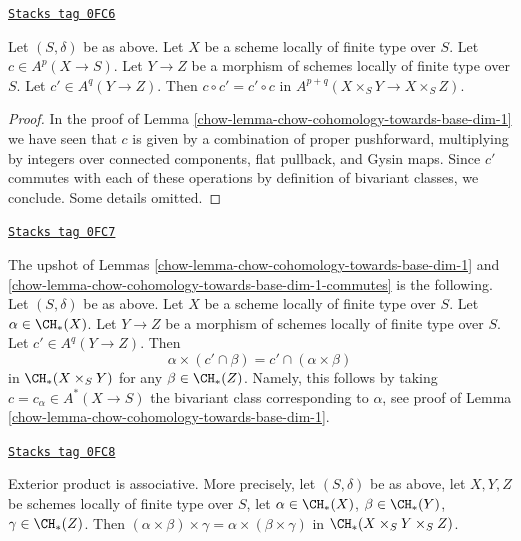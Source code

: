 \begin{lemma}
\label{chow-lemma-chow-cohomology-towards-base-dim-1-commutes}
\href{https://stacks.math.columbia.edu/tag/0FC6}{\texttt{Stacks tag 0FC6}}

Let $(S, \delta)$ be as above. Let $X$ be a scheme locally of finite type
over $S$. Let $c \in A^p(X \to S)$. Let $Y \to Z$ be a morphism of schemes
locally of finite type over $S$. Let $c' \in A^q(Y \to Z)$. Then
$c \circ c' = c' \circ c$ in $A^{p + q}(X \times_S Y \to X \times_S Z)$.
\end{lemma}

\begin{proof}

In the proof of Lemma \ref{chow-lemma-chow-cohomology-towards-base-dim-1}
we have seen that $c$ is given by a combination of
proper pushforward, multiplying by integers over connected
components, flat pullback, and Gysin maps. Since $c'$ commutes with each of
these operations by definition of bivariant classes, we conclude.
Some details omitted.
\end{proof}

\begin{remark}
\label{chow-remark-commuting-exterior-dim-1}
\href{https://stacks.math.columbia.edu/tag/0FC7}{\texttt{Stacks tag 0FC7}}

The upshot of Lemmas \ref{chow-lemma-chow-cohomology-towards-base-dim-1}
and \ref{chow-lemma-chow-cohomology-towards-base-dim-1-commutes} is the following.
Let $(S, \delta)$ be as above. Let $X$ be a scheme locally of finite type
over $S$.
Let $\alpha \in \CH_*(X)$. Let $Y \to Z$ be a morphism of schemes
locally of finite type over $S$. Let $c' \in A^q(Y \to Z)$. Then
$$
\alpha \times (c' \cap \beta) = c' \cap (\alpha \times \beta)
$$
in $\CH_*(X \times_S Y)$ for any $\beta \in \CH_*(Z)$. Namely, this
follows by taking $c = c_\alpha \in A^*(X \to S)$ the bivariant class
corresponding to $\alpha$, see proof of
Lemma \ref{chow-lemma-chow-cohomology-towards-base-dim-1}.
\end{remark}

\begin{lemma}
\label{chow-lemma-exterior-product-associative-dim-1}
\href{https://stacks.math.columbia.edu/tag/0FC8}{\texttt{Stacks tag 0FC8}}

Exterior product is associative. More precisely, let $(S, \delta)$ be
as above, let $X, Y, Z$ be schemes locally of finite type over $S$, let
$\alpha \in \CH_*(X)$, $\beta \in \CH_*(Y)$, $\gamma \in \CH_*(Z)$.
Then $(\alpha \times \beta) \times \gamma =
\alpha \times (\beta \times \gamma)$ in $\CH_*(X \times_S Y \times_S Z)$.
\end{lemma}

